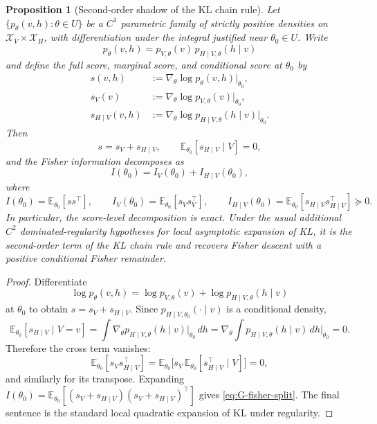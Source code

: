 \documentclass[11pt,a4paper]{article}
\numberwithin{equation}{section}
\theoremstyle{thmcompact}
\newtheorem{proposition}[theorem]{Proposition}
\theoremstyle{remark}
\begin{document}
\begin{proposition}[Second-order shadow of the KL chain rule]\label{prop:G-to-A}
Let $\{p_\theta(v,h): \theta \in U\}$ be a $C^1$ parametric family of strictly positive densities on $\mathcal{X}_V \times \mathcal{X}_H$, with differentiation under the integral justified near $\theta_0 \in U$. Write
\[
p_\theta(v,h)=p_{V,\theta}(v)\,p_{H\mid V,\theta}(h\mid v)
\]
and define the full score, marginal score, and conditional score at $\theta_0$ by
\[
\begin{aligned}
s(v,h)&:=\nabla_\theta \log p_\theta(v,h)\big|_{\theta_0},\\
s_V(v)&:=\nabla_\theta \log p_{V,\theta}(v)\big|_{\theta_0},\\
s_{H\mid V}(v,h)&:=\nabla_\theta \log p_{H\mid V,\theta}(h\mid v)\big|_{\theta_0}.
\end{aligned}
\]
Then
\[
s=s_V+s_{H\mid V},\qquad \mathbb{E}_{\theta_0}[s_{H\mid V}\mid V]=0,
\]
and the Fisher information decomposes as
\begin{equation}\label{eq:G-fisher-split}
I(\theta_0)=I_V(\theta_0)+I_{H\mid V}(\theta_0),
\end{equation}
where
\[
I(\theta_0)=\mathbb{E}_{\theta_0}[ss^\top],\qquad
I_V(\theta_0)=\mathbb{E}_{\theta_0}[s_Vs_V^\top],\qquad
I_{H\mid V}(\theta_0)=\mathbb{E}_{\theta_0}[s_{H\mid V}s_{H\mid V}^\top]\succeq 0.
\]
In particular, the score-level decomposition is exact. Under the usual additional $C^2$ dominated-regularity hypotheses for local asymptotic expansion of KL, it is the second-order term of the KL chain rule and recovers Fisher descent with a positive conditional Fisher remainder.
\end{proposition}

\begin{proof}
Differentiate
\[
\log p_\theta(v,h)=\log p_{V,\theta}(v)+\log p_{H\mid V,\theta}(h\mid v)
\]
at $\theta_0$ to obtain $s=s_V+s_{H\mid V}$. Since $p_{H\mid V,\theta_0}(\cdot\mid v)$ is a conditional density,
\[
\mathbb{E}_{\theta_0}[s_{H\mid V}\mid V=v]=\int \nabla_\theta p_{H\mid V,\theta}(h\mid v)\big|_{\theta_0}\,dh=\nabla_\theta\!\int p_{H\mid V,\theta}(h\mid v)\,dh\big|_{\theta_0}=0.
\]
Therefore the cross term vanishes:
\[
\mathbb{E}_{\theta_0}[s_Vs_{H\mid V}^\top]=\mathbb{E}_{\theta_0}\bigl[s_V\,\mathbb{E}_{\theta_0}[s_{H\mid V}^\top\mid V]\bigr]=0,
\]
and similarly for its transpose. Expanding $I(\theta_0)=\mathbb{E}_{\theta_0}[(s_V+s_{H\mid V})(s_V+s_{H\mid V})^\top]$ gives \eqref{eq:G-fisher-split}. The final sentence is the standard local quadratic expansion of KL under regularity.
\end{proof}
\end{document}
